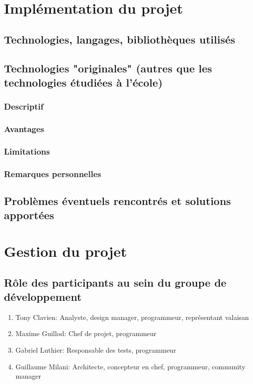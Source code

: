 \documentclass[a4paper,11pt]{article}
\begin{document}
	
	\section{Implémentation du projet}
	
	
	\subsection{Technologies, langages, bibliothèques utilisés}
	
	\subsection{Technologies "originales" (autres que les technologies étudiées à l'école)}
	\subsubsection{Descriptif}
	\subsubsection{Avantages}
	\subsubsection{Limitations}
	\subsubsection{Remarques personnelles}
	
	\subsection{Problèmes éventuels rencontrés et solutions apportées}
	
	
	\section{Gestion du projet}
	
	
	\subsection{Rôle des participants au sein du groupe de développement}
	\begin{enumerate}
		\item Tony Clavien: Analyste, design manager, programmeur, représentant valaisan
		\item Maxime Guillod: Chef de projet, programmeur
		\item Gabriel Luthier: Responsable des tests, programmeur
		\item Guillaume Milani: Architecte, concepteur en chef, programmeur, community manager
	\end{enumerate}
	
\end{document}

